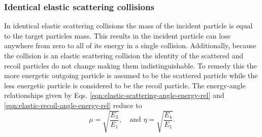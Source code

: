 \documentclass[../main.tex]{subfiles}
\begin{document}
\subsubsection{Identical elastic scattering collisions}
In identical elastic scattering collisions the mass of the incident particle is equal to the target particles mass. This results in the incident particle can lose anywhere from zero to all of its energy in a single collision. Additionally, because the collision is an elastic scattering collision the identity of the scattered and recoil particles do not change making them indistinguishable. To remedy this the more energetic outgoing particle is assumed to be the scattered particle while the less energetic particle is considered to be the recoil particle. The energy-angle relationships given by Eqs. \eqref{eqn:elastic-scattering-angle-energy-rel}  and \eqref{eqn:elastic-recoil-angle-energy-rel} reduce to
\begin{equation}
  \mu = \sqrt{\dfrac{E_3}{E_1}}, \quad \text{and} \,\, \eta = \sqrt{\dfrac{E_4}{E_1}}.
\end{equation}
\end{document}
